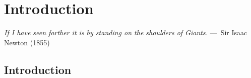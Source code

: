 
\chapter{Introduction}
\label{ch:Introduction}

\begin{epigraph}    
 \emph{If I have seen farther it is by standing on the shoulders of Giants.} ---~Sir Isaac Newton (1855)
\end{epigraph}

\section{Introduction}

